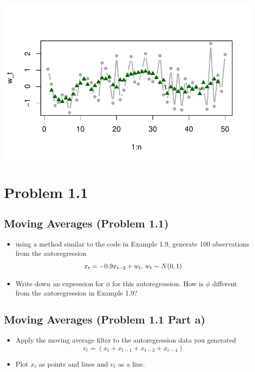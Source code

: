\documentclass[
  letterpaper,
  DIV=11,
  numbers=noendperiod]{scrreprt}
\providecommand{\tightlist}{%
  \setlength{\itemsep}{0pt}\setlength{\parskip}{0pt}}\usepackage{longtable,booktabs,array}
\begin{document}
\includegraphics{LectureNotes/Lecture2_files/figure-pdf/unnamed-chunk-14-2.pdf}

\chapter{Problem 1.1}\label{problem-1.1}

\section{Moving Averages (Problem
1.1)}\label{moving-averages-problem-1.1}

\begin{itemize}
\tightlist
\item
  using a method similar to the code in Example 1.9, generate 100
  observations from the autoregression \[
  x_t = -0.9x_{t-2} + w_t\text{, }\\ w_t\sim N(0, 1)
  \]
\item
  Write down an expression for \(\phi\) for this autoregression. How is
  \(\phi\) different from the autoregression in Example 1.9?
\end{itemize}

\section{Moving Averages (Problem 1.1 Part
a)}\label{moving-averages-problem-1.1-part-a}

\begin{itemize}
\item
  Apply the moving average filter to the autoregression data you
  generated \[
  v_t = (x_t + x_{t-1} + x_{t-2} + x_{t-4})
  \]
\item
  Plot \(x_t\) as points and lines and \(v_t\) as a line.
\end{itemize}
\end{document}
